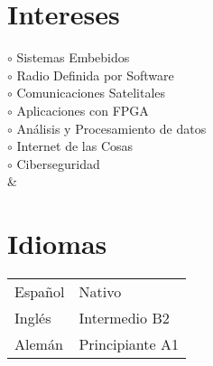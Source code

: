 \documentclass[a4paper,10pt]{article}
\begin{document}
\begin{adjustbox}{valign=t}
\begin{minipage}{0.34\textwidth}
\section*{Intereses}
\raggedright
\textcolor{ColorOne}{$\circ$} Sistemas Embebidos\\
\textcolor{ColorOne}{$\circ$} Radio Definida por Software\\
\textcolor{ColorOne}{$\circ$} Comunicaciones Satelitales\\
\textcolor{ColorOne}{$\circ$} Aplicaciones con FPGA\\
\textcolor{ColorOne}{$\circ$} Análisis y Procesamiento de datos\\
\textcolor{ColorOne}{$\circ$} Internet de las Cosas\\
\textcolor{ColorOne}{$\circ$} Ciberseguridad\\
&\vfill
\section*{Idiomas}
\begin{tabular}{ll}
	Español 	&  Nativo \\
	Inglés 		& Intermedio B2\\
	Alemán      & Principiante A1
 \end{tabular}
\end{minipage}
\end{adjustbox}
\hfill
\begin{adjustbox}{valign=t}
\begin{minipage}{0.001\textwidth} %
\MyVerticalRule  %
\end{minipage}
\end{adjustbox}
\hfill
\end{document}
